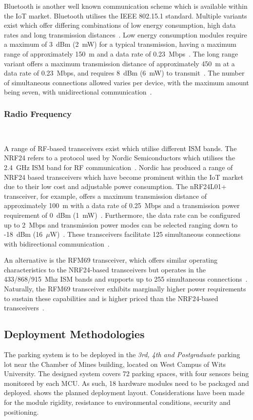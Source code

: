 \documentclass[10pt,twocolumn]{witseiepaper}
\begin{document}
			Bluetooth is another well known communication scheme which is available within the IoT market. Bluetooth utilises the IEEE 802.15.1 standard. Multiple variants exist which offer differing combinations of low energy consumption, high data rates and long transmission distances~\cite{802.15.2}. Low energy consumption modules require a maximum of 3~dBm (2~mW) for a typical transmission, having a maximum range of approximately 150~m and a data rate of 0.23~Mbps~\cite{BLE112}. The long range variant offers a maximum transmission distance of approximately 450~m at a data rate of 0.23~Mbps, and requires 8~dBm (6~mW) to transmit~\cite{BLE112LR}. The number of simultaneous connections allowed varies per device, with the maximum amount being seven, with unidirectional communication~\cite{bluetooth-users}.

		\subsubsection{Radio Frequency} $   $
		
			A range of RF-based transceivers exist which utilise different ISM bands. The NRF24 refers to a protocol used by Nordic Semiconductors which utilises the 2.4~GHz ISM band for RF communication~\cite{nrf24}. Nordic has produced a range of NRF24 based transceivers which have become prominent within the IoT market due to their low cost and adjustable power consumption. The nRF24L01+ transceiver, for example, offers a maximum transmission distance of approximately 100~m with a data rate of 0.25~Mbps and a transmission power requirement of 0~dBm (1~mW)~\cite{nrf24}. Furthermore, the data rate can be configured up to 2~Mbps and transmission power modes can be selected ranging down to -18~dBm (16~$\mu$W)~\cite{nrf24}. These transceivers facilitate 125 simultaneous connections with bidirectional communication~\cite{nrf24}.
			
			An alternative is the RFM69 transceiver, which offers similar operating characteristics to the NRF24-based transceivers but operates in the 433/868/915~Mhz ISM bands and supports up to 255 simultaneous connections~\cite{rfm69}. Naturally, the RFM69 transceiver exhibits marginally higher power requirements to sustain these capabilities and is higher priced than the NRF24-based transceivers~\cite{rfm69}.
	
	\subsection{Deployment Methodologies}
		The parking system is to be deployed in the \textit{3rd, 4th and Postgraduate} parking lot near the Chamber of Mines building, located on West Campus of Wits University. The designed system covers 72 parking spaces, with four sensors being monitored by each MCU. As such, 18 hardware modules need to be packaged and deployed.  shows the planned deployment layout. Considerations have been made for the module rigidity, resistance to environmental conditions, security and positioning.
		
\end{document}
